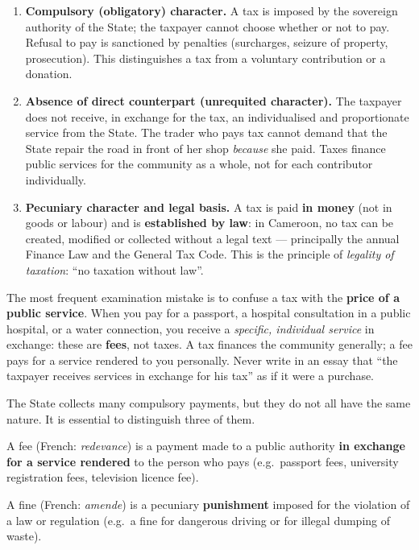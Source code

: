 \documentclass[11pt]{article}
\newcommand{\cle}[1]{{\popxbold\color{popdark}#1}}
\newcounter{popsec}
\newcounter{popsub}
\newcommand{\courssub}[1]{%
  \stepcounter{popsub}%
  \par\vspace{9pt}\noindent{\popxbold\fontsize{11.5}{13}\selectfont\color{popink}{\color{poporange}\thepopsec.\thepopsub}\hspace{6pt}#1}\par\nopagebreak\vspace{4pt}
}
\begin{document}
\begin{enumerate}
\item \textbf{Compulsory (obligatory) character.} A tax is imposed by the sovereign authority of the State; the taxpayer cannot choose whether or not to pay. Refusal to pay is sanctioned by penalties (surcharges, seizure of property, prosecution). This distinguishes a tax from a voluntary contribution or a donation.
\item \textbf{Absence of direct counterpart (unrequited character).} The taxpayer does not receive, in exchange for the tax, an individualised and proportionate service from the State. The trader who pays tax cannot demand that the State repair the road in front of her shop \emph{because} she paid. Taxes finance public services for the community as a whole, not for each contributor individually.
\item \textbf{Pecuniary character and legal basis.} A tax is paid \textbf{in money} (not in goods or labour) and is \textbf{established by law}: in Cameroon, no tax can be created, modified or collected without a legal text — principally the annual Finance Law and the General Tax Code. This is the principle of \emph{legality of taxation}: ``no taxation without law''.
\end{enumerate}

\begin{attention}
The most frequent examination mistake is to confuse a tax with the \textbf{price of a public service}. When you pay for a passport, a hospital consultation in a public hospital, or a water connection, you receive a \emph{specific, individual service} in exchange: these are \textbf{fees}, not taxes. A tax finances the community generally; a fee pays for a service rendered to you personally. Never write in an essay that ``the taxpayer receives services in exchange for his tax'' as if it were a purchase.
\end{attention}

\courssub{Tax, Fee and Fine: Three Different Levies}

The State collects many compulsory payments, but they do not all have the same nature. It is essential to distinguish three of them.

\begin{definition}
A \cle{fee} (French: \emph{redevance}) is a payment made to a public authority \textbf{in exchange for a service rendered} to the person who pays (e.g.\ passport fees, university registration fees, television licence fee).

A \cle{fine} (French: \emph{amende}) is a pecuniary \textbf{punishment} imposed for the violation of a law or regulation (e.g.\ a fine for dangerous driving or for illegal dumping of waste).
\end{definition}
\end{document}
